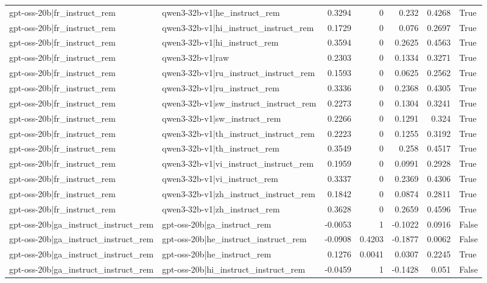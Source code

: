 \begin{table}
\begin{tabular}{l l r r r r l}
gpt-oss-20b|fr_instruct_rem & qwen3-32b-v1|he_instruct_rem & 0.3294 & 0 & 0.232 & 0.4268 & True \\
gpt-oss-20b|fr_instruct_rem & qwen3-32b-v1|hi_instruct_instruct_rem & 0.1729 & 0 & 0.076 & 0.2697 & True \\
gpt-oss-20b|fr_instruct_rem & qwen3-32b-v1|hi_instruct_rem & 0.3594 & 0 & 0.2625 & 0.4563 & True \\
gpt-oss-20b|fr_instruct_rem & qwen3-32b-v1|raw & 0.2303 & 0 & 0.1334 & 0.3271 & True \\
gpt-oss-20b|fr_instruct_rem & qwen3-32b-v1|ru_instruct_instruct_rem & 0.1593 & 0 & 0.0625 & 0.2562 & True \\
gpt-oss-20b|fr_instruct_rem & qwen3-32b-v1|ru_instruct_rem & 0.3336 & 0 & 0.2368 & 0.4305 & True \\
gpt-oss-20b|fr_instruct_rem & qwen3-32b-v1|sw_instruct_instruct_rem & 0.2273 & 0 & 0.1304 & 0.3241 & True \\
gpt-oss-20b|fr_instruct_rem & qwen3-32b-v1|sw_instruct_rem & 0.2266 & 0 & 0.1291 & 0.324 & True \\
gpt-oss-20b|fr_instruct_rem & qwen3-32b-v1|th_instruct_instruct_rem & 0.2223 & 0 & 0.1255 & 0.3192 & True \\
gpt-oss-20b|fr_instruct_rem & qwen3-32b-v1|th_instruct_rem & 0.3549 & 0 & 0.258 & 0.4517 & True \\
gpt-oss-20b|fr_instruct_rem & qwen3-32b-v1|vi_instruct_instruct_rem & 0.1959 & 0 & 0.0991 & 0.2928 & True \\
gpt-oss-20b|fr_instruct_rem & qwen3-32b-v1|vi_instruct_rem & 0.3337 & 0 & 0.2369 & 0.4306 & True \\
gpt-oss-20b|fr_instruct_rem & qwen3-32b-v1|zh_instruct_instruct_rem & 0.1842 & 0 & 0.0874 & 0.2811 & True \\
gpt-oss-20b|fr_instruct_rem & qwen3-32b-v1|zh_instruct_rem & 0.3628 & 0 & 0.2659 & 0.4596 & True \\
gpt-oss-20b|ga_instruct_instruct_rem & gpt-oss-20b|ga_instruct_rem & -0.0053 & 1 & -0.1022 & 0.0916 & False \\
gpt-oss-20b|ga_instruct_instruct_rem & gpt-oss-20b|he_instruct_instruct_rem & -0.0908 & 0.4203 & -0.1877 & 0.0062 & False \\
gpt-oss-20b|ga_instruct_instruct_rem & gpt-oss-20b|he_instruct_rem & 0.1276 & 0.0041 & 0.0307 & 0.2245 & True \\
gpt-oss-20b|ga_instruct_instruct_rem & gpt-oss-20b|hi_instruct_instruct_rem & -0.0459 & 1 & -0.1428 & 0.051 & False \\

\end{tabular}
\end{table}
